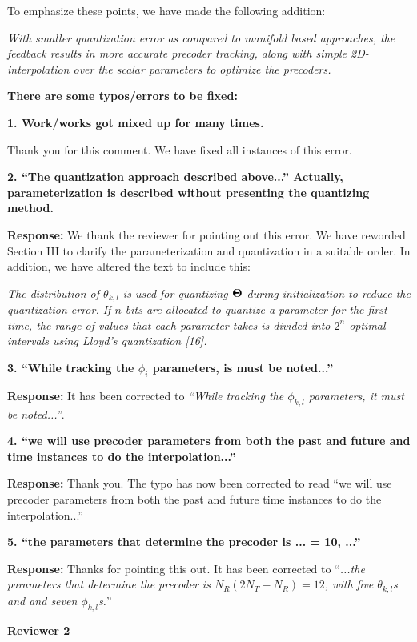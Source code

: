 \documentclass[12pt]{letter}
\begin{document}
To emphasize these points, we have made the following addition:

\emph{With smaller
quantization error as compared to manifold based approaches, the
feedback results in more accurate precoder tracking, along with simple
2D-interpolation over the scalar parameters to optimize the precoders.}

\textbf{There are some typos/errors to be fixed:}

\textbf{1. Work/works got mixed up for many times.}

Thank you for this comment. We have fixed all instances of this error.

\textbf{2. ``The quantization approach described above...'' Actually,
  parameterization is described without presenting the quantizing
  method.}

\textbf{Response:} We thank the reviewer for pointing out this
error. We have reworded Section III to clarify the parameterization and quantization
in a suitable order. In addition, we have altered the text to include this:

\emph{The distribution of $\theta_{k,l}$ is used for
quantizing $\bf{\Theta}$ during initialization to reduce the
quantization error.  If $n$ bits are allocated to quantize a
parameter for the first time, the range of values that each parameter
takes is divided into $2^n$ optimal intervals using Lloyd's
quantization [16].}

\textbf{3. ``While tracking the $\phi_i$ parameters, is must be noted...''}

\textbf{Response:} It has been corrected to \emph{``While tracking the $\phi_{k,l}$ parameters, it must be noted...''}.

\textbf{4. ``we will use precoder parameters from both the past and future and
time instances to do the interpolation...''}

\textbf{Response:} Thank you. The typo has now been corrected to read
``we will use precoder parameters from both the past and future time instances to do the interpolation...''

\textbf{5. ``the parameters that determine the precoder is ...  = 10, ...''}

\textbf{Response:} Thanks for pointing this out. It has been corrected to ``\emph{...the parameters that determine the precoder is
$N_{R}(2N_{T} - N_R) = 12$, with five $\theta_{k,l}$s and and seven
$\phi_{k,l}$s.}''

\textbf{Reviewer 2}\\
\end{document}
